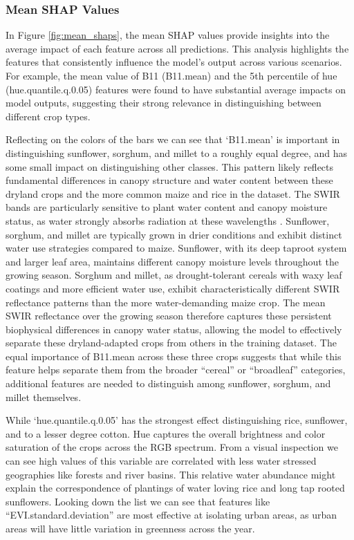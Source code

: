 \documentclass[
  journal,
  twocolumn]{IEEEtran}
\begin{document}
\subsubsection{Mean SHAP Values}\label{mean-shap-values}

In Figure \ref{fig:mean_shaps}, the mean SHAP values provide insights
into the average impact of each feature across all predictions. This
analysis highlights the features that consistently influence the model's
output across various scenarios. For example, the mean value of B11
(B11.mean) and the 5th percentile of hue (hue.quantile.q.0.05) features
were found to have substantial average impacts on model outputs,
suggesting their strong relevance in distinguishing between different
crop types.

Reflecting on the colors of the bars we can see that `B11.mean' is
important in distinguishing sunflower, sorghum, and millet to a roughly
equal degree, and has some small impact on distinguishing other classes.
This pattern likely reflects fundamental differences in canopy structure
and water content between these dryland crops and the more common maize
and rice in the dataset. The SWIR bands are particularly sensitive to
plant water content and canopy moisture status, as water strongly
absorbs radiation at these wavelengths \citep{rs13173371}. Sunflower,
sorghum, and millet are typically grown in drier conditions and exhibit
distinct water use strategies compared to maize. Sunflower, with its
deep taproot system and larger leaf area, maintains different canopy
moisture levels throughout the growing season. Sorghum and millet, as
drought-tolerant cereals with waxy leaf coatings and more efficient
water use, exhibit characteristically different SWIR reflectance
patterns than the more water-demanding maize crop. The mean SWIR
reflectance over the growing season therefore captures these persistent
biophysical differences in canopy water status, allowing the model to
effectively separate these dryland-adapted crops from others in the
training dataset. The equal importance of B11.mean across these three
crops suggests that while this feature helps separate them from the
broader ``cereal'' or ``broadleaf'' categories, additional features are
needed to distinguish among sunflower, sorghum, and millet themselves.

While `hue.quantile.q.0.05' has the strongest effect distinguishing
rice, sunflower, and to a lesser degree cotton. Hue captures the overall
brightness and color saturation of the crops across the RGB spectrum.
From a visual inspection we can see high values of this variable are
correlated with less water stressed geographies like forests and river
basins. This relative water abundance might explain the correspondence
of plantings of water loving rice and long tap rooted sunflowers.
Looking down the list we can see that features like
``EVI.standard.deviation'' are most effective at isolating urban areas,
as urban areas will have little variation in greenness across the year.
\end{document}
